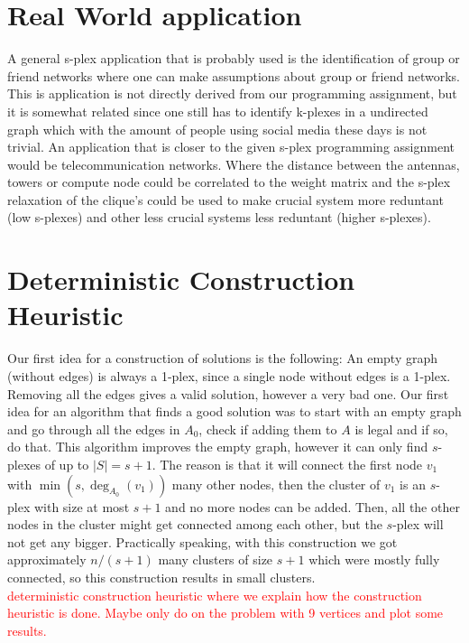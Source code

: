 \section{Real World application}

A general s-plex application that is probably used is the identification of group or friend networks
where one can make assumptions about group or friend networks. This is application is not directly
derived from our programming assignment, but it is somewhat related since one still has to identify k-plexes in a
undirected graph which with the amount of people using social media these days is not trivial.
An application that is closer to the given s-plex programming assignment would be telecommunication networks.
Where the distance between the antennas, towers or compute node could be correlated to the weight matrix and the s-plex
relaxation of the clique's could be used to make crucial system more reduntant (low s-plexes) and other less crucial systems
less reduntant (higher s-plexes).

\section{Deterministic Construction Heuristic}

Our first idea for a construction of solutions is the following: An empty graph (without edges) is always 
a 1-plex, since a single node without edges is a 1-plex. Removing all the edges gives a valid solution, 
however a very bad one. Our first idea for an algorithm that finds a good solution was to start with an 
empty graph and go through all the edges in $A_0$, check if adding them to $A$ is legal and if so, do that. 
This algorithm improves the empty graph, however it can only find $s$-plexes of up to $|S|=s+1$. The reason 
is that it will connect the first node $v_1$ with $\min(s,\deg_{A_0} (v_1))$ many other nodes, then the 
cluster of $v_1$ is an $s$-plex with size at most $s+1$ and no more nodes can be added. Then, all the other 
nodes in the cluster might get connected among each other, but the $s$-plex will not get any bigger. 
Practically speaking, with this construction we got approximately $n/(s+1)$ many clusters of size $s+1$ 
which were mostly fully connected, so this construction results in small clusters.\\

\textcolor{red}{
deterministic construction heuristic where we explain how the construction heuristic is done.
Maybe only do on the problem with 9 vertices and plot some results.}

